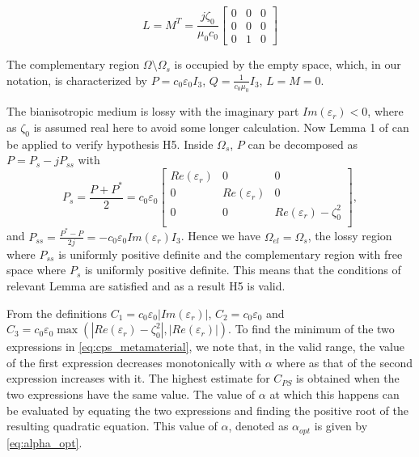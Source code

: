 \begin{equation} \label{constitutive_kraft_LM}
L = M^T = \frac{j\zeta_0}{\mu_0 c_0}
\begin{bmatrix}
0 & 0 & 0 \\
0 & 0 & 0 \\
0 &  1  & 0
\end{bmatrix} 
\end{equation}
 
The complementary region $\Omega \setminus \Omega_s$ is 
occupied by the empty space, which,  in our notation, is characterized by 
 $P=c_0\varepsilon_0I_3$, $Q=\frac{1}{c_0\mu_0}I_3$, $L=M=0$.

The bianisotropic medium is lossy with the imaginary part $Im(\varepsilon_r) < 0$, 
where as $\zeta_0$ is assumed real here to avoid some longer calculation. 
Now Lemma 1 of \cite{kalarickel2020well} can be applied to verify hypothesis H5.
Inside $\Omega_s$, $P$ can be decomposed as $P= P_s -j P_{ss}$ with
\begin{equation}
P_s = \frac{P+P^*}{2} =  c_0\varepsilon_0
\begin{bmatrix}
Re(\varepsilon_r) & 0 & 0 \\
0 & Re(\varepsilon_r) & 0 \\
0 & 0 & Re(\varepsilon_r) - \zeta_0^2 \\
\end{bmatrix},
\end{equation}
and  $P_{ss} = \frac{P^*-P}{2j} =  -c_0\varepsilon_0 Im(\varepsilon_r) I_3$.
Hence we have $\Omega_{el} = \Omega_s$, the lossy region 
where $P_{ss}$ is uniformly positive definite 
and the complementary region with free space where $P_s$ 
is uniformly positive definite.
This means that the conditions of relevant Lemma are satisfied and 
as a result H5 is valid.

From the definitions
$C_1=c_0\varepsilon_0 |Im(\varepsilon_r)|$, 
$C_2 = c_0\varepsilon_0$ and 
$C_3 = c_0\varepsilon_0 \max(|Re(\varepsilon_r) -\zeta_0^2|, |Re(\varepsilon_r)|)$.
To find the minimum of the two expressions in \eqref{eq:cps_metamaterial},
we note that, in the valid range, the value of the 
first expression decreases monotonically with  $\alpha$ where as
that of the second expression increases with it. 
The highest estimate for $C_{PS}$  is obtained when the two expressions 
have the same value.
The value of $\alpha$ at which this happens can be evaluated by 
equating the two expressions and finding the positive 
root of the resulting quadratic equation.
This value of $\alpha$, denoted as $\alpha_{opt}$ is given by 
\eqref{eq:alpha_opt}.

